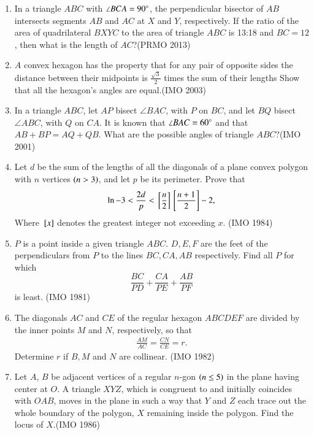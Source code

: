 \begin{enumerate}[label=\thesubsection.\arabic*,ref=\thesubsection.\theenumi]
\item In a triangle $ ABC $ with $ \angle BCA = 90\degree $, the perpendicular bisector of $ AB $ intersects segments $ AB $ and $ AC $ at $ X $ and $ Y $, respectively. If the ratio of the area of quadrilateral $ BXYC $ to the area of triangle $ ABC $ is 13:18 and $ BC = 12 $, then what is the length of $ AC $?\hfill(PRMO 2013)
\item $A$ convex hexagon has the property that for any pair of opposite sides the distance between their midpoints is $\frac{\sqrt{3}}{2}$ times the sum of their lengths Show that all the hexagon's angles are equal.\hfill(IMO 2003)
\item In a triangle $ABC$, let $AP$ bisect $\angle B AC$, with $P$ on $BC$, and let $BQ$ bisect $\angle A BC$, with $Q$ on $CA$. It is known that $\angle BAC= 60\degree$ and that $AB+BP=AQ+QB$. What are the possible angles of triangle $ABC$?\hfill(IMO 2001)
\item Let $d$ be the sum of the lengths of all the diagonals of a plane convex polygon with $n$ vertices $\left(n>3\right)$, and let $p$ be its perimeter. Prove that\begin{align*}                                    \ln -3<\frac{2d}{p}<{}\left[\frac{n}{2}\right]{}\left[\frac{n+1}{2}\right]-2,\end{align*}
		Where ${}\left[x\right]$ denotes the greatest integer not exceeding $x$.  \hfill(IMO 1984)
\item $P$ is a point inside a given triangle $ABC$. $D, E, F$ are the feet of the perpendiculars from $P$ to the lines $BC, CA, AB$ respectively. Find all $P$ for which $$\frac{BC}{PD}+\frac{CA}{PE}+\frac{AB}{PF}$$ is least. \hfill(IMO  1981)
 \item The diagonals $AC$ and $CE$ of the regular hexagon $ABCDEF$ are divided by the inner points $M$ and $N$, respectively, so that \begin{align*} \frac{AM}{AC}=\frac{CN}{CE}=r.
                   \end{align*}
 Determine $r$ if $B, M$ and $N$ are collinear. \hfill(IMO  1982)
    \item Let $A$, $B$ be adjacent vertices of a regular $n$-gon $\left(n\leq5\right)$ in the plane having center at $O$. A triangle $XYZ$, which is congruent to and initially coincides with $OAB$, moves in the plane in such a way that $Y$ and $Z$ each trace out the whole boundary of the polygon, $X$ remaining inside the polygon. Find the locus of $X$.\hfill(IMO  1986)


\end{enumerate}
